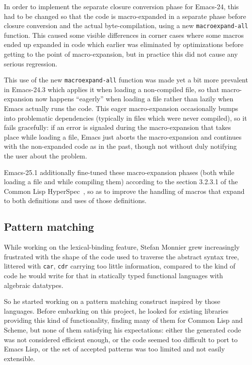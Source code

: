 \documentclass[format=acmsmall, review]{acmart}
\newcommand \Elisp {Emacs Lisp}
\begin{document}
In order to implement the separate closure conversion phase for Emacs-24,
this had to be changed so that the code is macro-expanded in a separate
phase before closure conversion and the actual byte-compilation, using a new
\texttt{macroexpand-all} function.
This caused some visible differences in corner cases where some macros ended
up expanded in code which earlier was eliminated by optimizations before
getting to the point of macro-expansion, but in practice this did not cause
any serious regression.

This use of the new \texttt{macroexpand-all} function was made yet a bit
more prevalent in Emacs-24.3 which applies it when loading
a non-compiled file, so that macro-expansion now happens ``eagerly'' when
loading a file rather than lazily when Emacs actually runs the code.  This eager
macro-expansion occasionally bumps into problematic dependencies (typically
in files which were never compiled), so it fails gracefully: if an
error is signaled during the macro-expansion that takes place while loading
a file, Emacs just aborts the macro-expansion and continues with the non-expanded
code as in the past, though not without duly notifying the user about
the problem.

Emacs-25.1 additionally fine-tuned these macro-expansion phases (both
while loading a file and while compiling them) according to the section
3.2.3.1 of the Common Lisp HyperSpec~\cite{HyperSpec}, so as to improve the
handling of macros that expand to both definitions and uses of
those definitions.

\subsection{Pattern matching}           %
\label{sec:pcase}

While working on the lexical-binding feature, Stefan Monnier grew
increasingly frustrated with the shape of the code used to traverse the
abstract syntax tree, littered with \texttt{car}, \texttt{cdr} carrying too
little information, compared to the kind of code he would write for that in
statically typed functional languages with algebraic datatypes.

So he started working on a pattern matching construct inspired by those
languages.  Before embarking on this project, he looked for existing
libraries providing this kind of functionality, finding many of them for
Common Lisp and Scheme, but none of them satisfying his expectations: either
the generated code was not considered efficient enough, or the code seemed
too difficult to port to \Elisp{}, or the set of accepted patterns was too
limited and not easily extensible.
\end{document}
